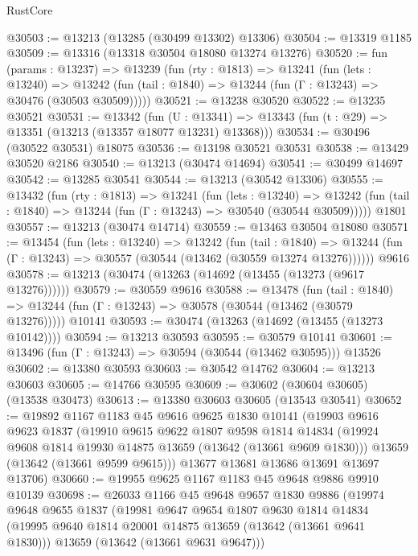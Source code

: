 \begin{lexlean}{RustCore}
\begin{coremodule}
@30503 := @13213 (@13285 (@30499 @13302) @13306)
@30504 := @13319 @1185
@30509 := @13316 (@13318 @30504 @18080 @13274 @13276)
@30520 := fun (params : @13237) =>
  @13239
    (fun (rty : @1813) =>
    @13241
      (fun (lets : @13240) =>
      @13242 (fun (tail : @1840) => @13244 (fun (Γ : @13243) => @30476 (@30503 @30509)))))
@30521 := @13238 @30520
@30522 := @13235 @30521
@30531 := @13342
    (fun (U : @13341) => @13343 (fun (t : @29) => @13351 (@13213 (@13357 @18077 @13231) @13368)))
@30534 := @30496 (@30522 @30531) @18075
@30536 := @13198 @30521 @30531
@30538 := @13429 @30520 @2186
@30540 := @13213 (@30474 @14694)
@30541 := @30499 @14697
@30542 := @13285 @30541
@30544 := @13213 (@30542 @13306)
@30555 := @13432
    (fun (rty : @1813) =>
    @13241
      (fun (lets : @13240) =>
      @13242 (fun (tail : @1840) => @13244 (fun (Γ : @13243) => @30540 (@30544 @30509)))))
    @1801
@30557 := @13213 (@30474 @14714)
@30559 := @13463 @30504 @18080
@30571 := @13454
    (fun (lets : @13240) =>
    @13242
      (fun (tail : @1840) =>
      @13244 (fun (Γ : @13243) => @30557 (@30544 (@13462 (@30559 @13274 @13276))))))
    @9616
@30578 := @13213 (@30474 (@13263 (@14692 (@13455 (@13273 (@9617 @13276))))))
@30579 := @30559 @9616
@30588 := @13478
    (fun (tail : @1840) => @13244 (fun (Γ : @13243) => @30578 (@30544 (@13462 (@30579 @13276)))))
    @10141
@30593 := @30474 (@13263 (@14692 (@13455 (@13273 @10142))))
@30594 := @13213 @30593
@30595 := @30579 @10141
@30601 := @13496 (fun (Γ : @13243) => @30594 (@30544 (@13462 @30595))) @13526
@30602 := @13380 @30593
@30603 := @30542 @14762
@30604 := @13213 @30603
@30605 := @14766 @30595
@30609 := @30602 (@30604 @30605) (@13538 @30473)
@30613 := @13380 @30603 @30605 (@13543 @30541)
@30652 := @19892
    @1167
    @1183
    @45
    @9616
    @9625
    @1830
    @10141
    (@19903
      @9616
      @9623
      @1837
      (@19910
        @9615
        @9622
        @1807
        @9598
        @1814
        @14834
        (@19924 @9608 @1814 @19930 @14875 @13659 (@13642 (@13661 @9609 @1830)))
        @13659
        (@13642 (@13661 @9599 @9615)))
      @13677
      @13681
      @13686
      @13691
      @13697
      @13706)
@30660 := @19955 @9625 @1167 @1183 @45 @9648 @9886 @9910 @10139
@30698 := @26033
    @1166
    @45
    @9648
    @9657
    @1830
    @9886
    (@19974
      @9648
      @9655
      @1837
      (@19981
        @9647
        @9654
        @1807
        @9630
        @1814
        @14834
        (@19995 @9640 @1814 @20001 @14875 @13659 (@13642 (@13661 @9641 @1830)))
        @13659
        (@13642 (@13661 @9631 @9647)))

\end{coremodule}
\end{lexlean}
